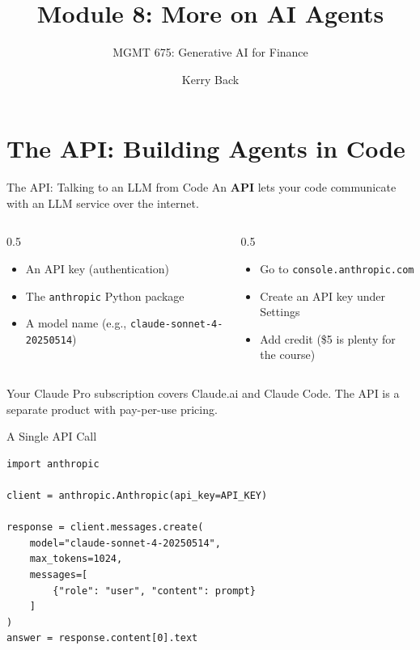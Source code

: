 \documentclass[aspectratio=169]{beamer}
\subtitle{MGMT 675: Generative AI for Finance}
\title{Module 8: More on AI Agents}
\author{Kerry Back}
\date{}
\begin{document}
\maketitle

\section{The API: Building Agents in Code}

\begin{frame}{The API: Talking to an LLM from Code}
An \textbf{API} lets your code communicate with an LLM service over the internet.
\vspace{0.3cm}
\begin{columns}[T]
\begin{column}{0.5\textwidth}
\begin{shadedbox}[title=\textbf{What You Need}]
\begin{itemize}\small
  \item An API key (authentication)
  \item The \texttt{anthropic} Python package
  \item A model name (e.g., \texttt{claude-sonnet-4-20250514})
\end{itemize}
\end{shadedbox}
\end{column}
\begin{column}{0.5\textwidth}
\begin{shadedbox}[title=\textbf{Getting Your Key}]
\begin{itemize}\small
  \item Go to \texttt{console.anthropic.com}
  \item Create an API key under Settings
  \item Add credit (\$5 is plenty for the course)
\end{itemize}
\end{shadedbox}
\end{column}
\end{columns}
\vspace{0.3cm}
Your Claude Pro subscription covers Claude.ai and Claude Code.  The API is a separate product with pay-per-use pricing.
\end{frame}

\begin{frame}[fragile]{A Single API Call}
\begin{shadedbox}[title=\textbf{Calling the Anthropic API}]
\begin{verbatim}
import anthropic

client = anthropic.Anthropic(api_key=API_KEY)

response = client.messages.create(
    model="claude-sonnet-4-20250514",
    max_tokens=1024,
    messages=[
        {"role": "user", "content": prompt}
    ]
)
answer = response.content[0].text
\end{verbatim}
\end{shadedbox}
\end{frame}
\end{document}
